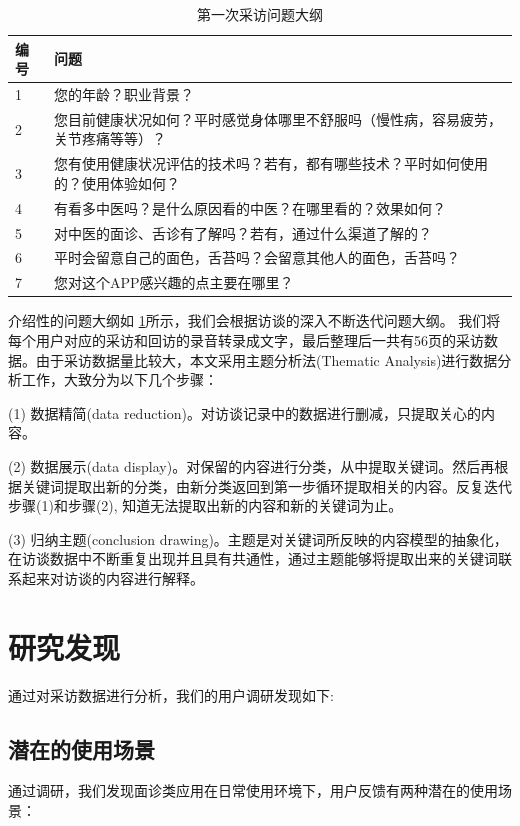 \begin{table}[h]
    \begin{tabular}{ll}
        \toprule
        编号 & 问题 \\
        \midrule
        1  & 您的年龄？职业背景？   \\
        2  & 您目前健康状况如何？平时感觉身体哪里不舒服吗（慢性病，容易疲劳，关节疼痛等等）？   \\
        3  &  您有使用健康状况评估的技术吗？若有，都有哪些技术？平时如何使用的？使用体验如何？  \\
        4  & 有看多中医吗？是什么原因看的中医？在哪里看的？效果如何？   \\
        5   & 对中医的面诊、舌诊有了解吗？若有，通过什么渠道了解的？   \\
        6  & 平时会留意自己的面色，舌苔吗？会留意其他人的面色，舌苔吗？\\
        7   & 您对这个APP感兴趣的点主要在哪里？\\
        \bottomrule
    \end{tabular}
    \caption{第一次采访问题大纲}
    \label{tab:inteview_questions}
\end{table}

介绍性的问题大纲如 \ref{tab:inteview_questions}所示，我们会根据访谈的深入不断迭代问题大纲。
我们将每个用户对应的采访和回访的录音转录成文字，最后整理后一共有56页的采访数据。由于采访数据量比较大，本文采用主题分析法(Thematic Analysis)进行数据分析工作，大致分为以下几个步骤\cite{SchwandtQualitative}：

(1) 数据精简(data reduction)。对访谈记录中的数据进行删减，只提取关心的内容。

(2) 数据展示(data display)。对保留的内容进行分类，从中提取关键词。然后再根据关键词提取出新的分类，由新分类返回到第一步循环提取相关的内容。反复迭代步骤(1)和步骤(2), 知道无法提取出新的内容和新的关键词为止。

(3) 归纳主题(conclusion drawing)。主题是对关键词所反映的内容模型的抽象化，在访谈数据中不断重复出现并且具有共通性，通过主题能够将提取出来的关键词联系起来对访谈的内容进行解释。

\section{研究发现}

通过对采访数据进行分析，我们的用户调研发现如下:
\subsection{潜在的使用场景}
通过调研，我们发现面诊类应用在日常使用环境下，用户反馈有两种潜在的使用场景：

